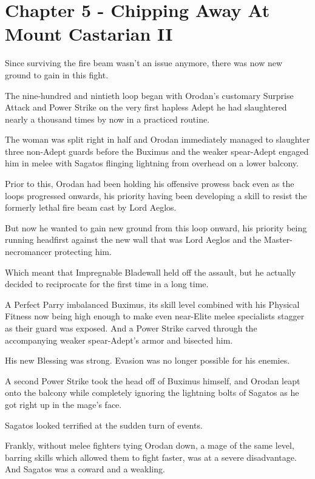 \documentclass[a4paper,10pt]{book}
\begin{document}
\section*{Chapter 5 - Chipping Away At Mount Castarian II}
%
\par
Since surviving the fire beam wasn’t an issue anymore, there was now new ground to gain in this fight.\par
The nine-hundred and nintieth loop began with Orodan’s customary Surprise Attack and Power Strike on the very first hapless Adept he had slaughtered nearly a thousand times by now in a practiced routine.\par
The woman was split right in half and Orodan immediately managed to slaughter three non-Adept guards before the Buximus and the weaker spear-Adept engaged him in melee with Sagatos flinging lightning from overhead on a lower balcony.\par
Prior to this, Orodan had been holding his offensive prowess back even as the loops progressed onwards, his priority having been developing a skill to resist the formerly lethal fire beam cast by Lord Aeglos.\par
But now he wanted to gain new ground from this loop onward, his priority being running headfirst against the new wall that was Lord Aeglos and the Master-necromancer protecting him.\par
Which meant that Impregnable Bladewall held off the assault, but he actually decided to reciprocate for the first time in a long time.\par
A Perfect Parry imbalanced Buximus, its skill level combined with his Physical Fitness now being high enough to make even near-Elite melee specialists stagger as their guard was exposed. And a Power Strike carved through the accompanying weaker spear-Adept’s armor and bisected him.\par
His new Blessing was strong. Evasion was no longer possible for his enemies.\par
A second Power Strike took the head off of Buximus himself, and Orodan leapt onto the balcony while completely ignoring the lightning bolts of Sagatos as he got right up in the mage’s face.\par
Sagatos looked terrified at the sudden turn of events.\par
Frankly, without melee fighters tying Orodan down, a mage of the same level, barring skills which allowed them to fight faster, was at a severe disadvantage. And Sagatos was a coward and a weakling.\par
\end{document}
